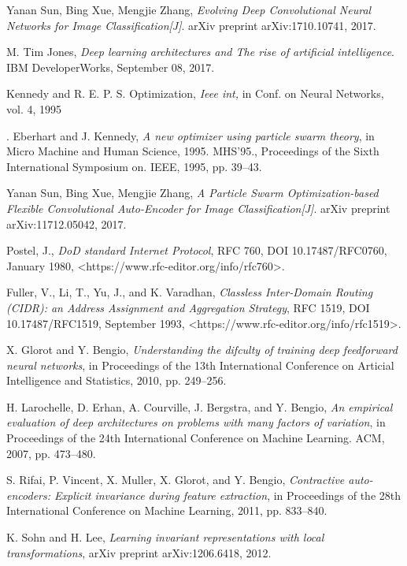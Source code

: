 \documentclass[conference]{IEEEtran}
\begin{document}
\begin{thebibliography}{}
Yanan Sun, Bing Xue, Mengjie Zhang, \emph{Evolving Deep Convolutional Neural Networks for Image Classification[J]}. arXiv preprint arXiv:1710.10741, 2017.

M. Tim Jones, \emph{Deep learning architectures and The rise of artificial intelligence}. IBM DeveloperWorks, September 08, 2017.

Kennedy and R. E. P. S. Optimization, \emph{Ieee int,} in Conf. on Neural Networks, vol. 4, 1995

. Eberhart and J. Kennedy, \emph{A new optimizer using particle swarm theory}, in Micro Machine and Human Science, 1995. MHS’95., Proceedings of the Sixth International Symposium on.  IEEE, 1995, pp. 39–43.

Yanan Sun, Bing Xue, Mengjie Zhang, \emph{A Particle Swarm Optimization-based Flexible Convolutional Auto-Encoder for Image Classification[J]}. arXiv preprint arXiv:11712.05042, 2017.

Postel, J., \emph{DoD standard Internet Protocol}, RFC 760, DOI 10.17487/RFC0760, January 1980, <https://www.rfc-editor.org/info/rfc760>.

Fuller, V., Li, T., Yu, J., and K. Varadhan, \emph{Classless Inter-Domain Routing (CIDR): an Address Assignment and Aggregation Strategy}, RFC 1519, DOI 10.17487/RFC1519, September 1993, <https://www.rfc-editor.org/info/rfc1519>.

X. Glorot and Y. Bengio, \emph{Understanding the difculty of training deep feedforward neural networks}, in Proceedings of the 13th International Conference on Articial Intelligence and Statistics, 2010, pp. 249–256.

H. Larochelle, D. Erhan, A. Courville, J. Bergstra, and Y. Bengio, \emph{An empirical evaluation of deep architectures on problems with many factors of variation}, in Proceedings of the 24th International Conference on Machine Learning. ACM, 2007, pp. 473–480.

S. Rifai, P. Vincent, X. Muller, X. Glorot, and Y. Bengio, \emph{Contractive auto-encoders: Explicit invariance during feature extraction}, in Proceedings of the 28th International Conference on Machine Learning, 2011, pp. 833–840.

K. Sohn and H. Lee, \emph{Learning invariant representations with local transformations}, arXiv preprint arXiv:1206.6418, 2012.


\end{thebibliography}
\end{document}
